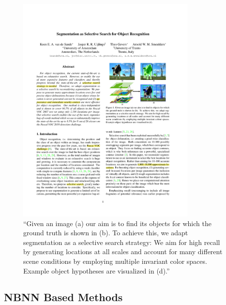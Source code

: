 \begin{figure}[hbt]
    \centering
    \includegraphics[width=0.8\textwidth]{LocByDet}
    \caption{``Given an image (a) our aim is to find its objects for which the ground truth is shown in (b). To achieve this, we adapt segmentation as a selective search strategy: We aim for high recall by generating locations at all scales and account for many different scene conditions by employing multiple invariant color spaces. Example object hypotheses are visualized in (d).'' \cite{van2011segmentation}}
    \label{fig:locbydet}
\end{figure}


\subsection{NBNN Based Methods} %
\label{sec:nbnn_based_methods}

